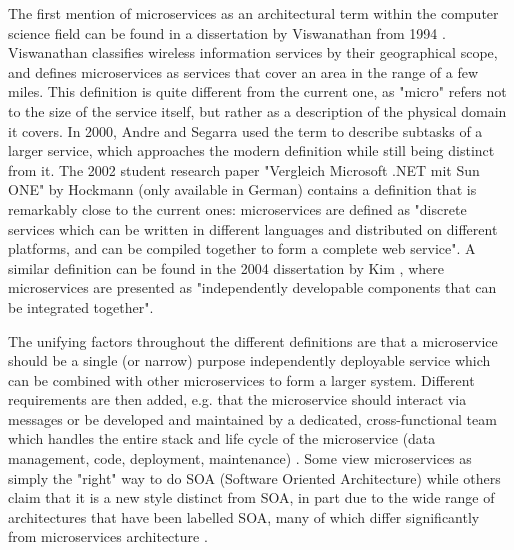 The first mention of microservices as an architectural term within the computer science field can be found in a dissertation by Viswanathan from 1994 \cite{viswanathan1994publishing}. Viswanathan classifies wireless information services by their geographical scope, and defines microservices as services that cover an area in the range of a few miles. This definition is quite different from the current one, as "micro" refers not to the size of the service itself, but rather as a description of the physical domain it covers. In 2000, Andre and Segarra \cite{andre2000generic} used the term to describe subtasks of a larger service, which approaches the modern definition while still being distinct from it.
The 2002 student research paper "Vergleich Microsoft .NET mit Sun ONE" by Hockmann \cite{hockmann2002vergleich} (only available in German) contains a definition that is remarkably close to the current ones: microservices are defined as "discrete services which can be written in different languages and distributed on different platforms, and can be compiled together to form a complete web service". A similar definition can be found in the 2004 dissertation by Kim \cite{kim2004foundation}, where microservices are presented as "independently developable components that can be integrated together".

The unifying factors throughout the different definitions are that a microservice should be a single (or narrow) purpose independently deployable service which can be combined with other microservices to form a larger system. Different requirements are then added, e.g. that the microservice should interact via messages \cite{dragoni2017microservices} or be developed and maintained by a dedicated, cross-functional team which handles the entire stack and life cycle of the microservice (data management, code, deployment, maintenance) \cite{fowler2014microservices}. Some view microservices as simply the "right" way to do SOA (Software Oriented Architecture) \cite{zimmermann2016microservices} while others claim that it is a new style distinct from SOA, in part due to the wide range of architectures that have been labelled SOA, many of which differ significantly from microservices architecture \cite{fowler2014microservices}.

